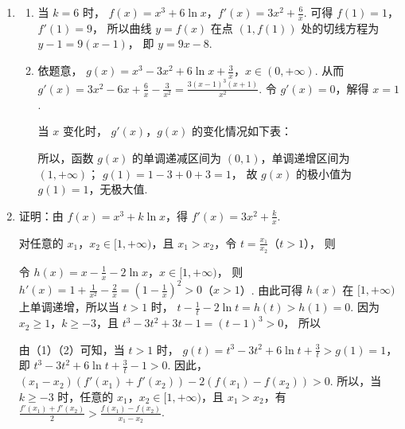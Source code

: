 \begin{solution}
\begin{enumerate}
\item
\begin{enumerate}
\item 当 \( k=6 \) 时，
\(f(x)=x^3+6\ln x\)，\(f'(x)=3x^2+\frac6x\).
可得 \( f(1)=1 \)，\( f'(1)=9 \)，
所以曲线 \( y=f(x) \) 在点 \( (1,f(1)) \) 处的切线方程为
\(y-1=9(x-1)\)，
即
\(y=9x-8\).

\item 依题意，
\(g(x)=x^3-3x^2+6\ln x+\frac3x\)，\(x\in(0,+\infty)\).
从而
\(g'(x)=3x^2-6x+\frac6x-\frac3{x^2} =\frac{3(x-1)^3(x+1)}{x^2}\).
令 \( g'(x)=0 \)，解得 \( x=1 \).

当 \( x \) 变化时， \( g'(x) \)，\( g(x) \) 的变化情况如下表：


所以，函数 \( g(x) \) 的单调递减区间为 \( (0,1) \)，单调递增区间为 \( (1,+\infty) \)；
\(g(1)=1-3+0+3=1\)，
故 \( g(x) \) 的极小值为 \( g(1)=1 \)，无极大值.

\end{enumerate}

\item 证明：由 \( f(x)=x^3+k\ln x \)，得
\(f'(x)=3x^2+\frac{k}{x}\).

对任意的 \(x_1\)，\(x_2\in[1,+\infty)\)，且 \( x_1>x_2 \)，令
\(t=\frac{x_1}{x_2}\)（\(t>1\)），
则

令
\(h(x)=x-\frac1x-2\ln x\)，\(x\in[1,+\infty)\)，
则
\(h'(x)=1+\frac1{x^2}-\frac2x=\left( 1-\frac1x \right)^2>0\)（\(x>1\)）.
由此可得 \( h(x) \) 在 \( [1,+\infty) \) 上单调递增，所以当 \( t>1 \) 时，
\(t-\frac1t-2\ln t=h(t)>h(1)=0\).
因为 \( x_2\ge1 \)，\( k\ge-3 \)，且
\(t^3-3t^2+3t-1=\left( t-1 \right)^3>0\)，
所以

由（1）（2）可知，当 \( t>1 \) 时，
\(g(t)=t^3-3t^2+6\ln t+\frac3t>g(1)=1\)，
即
\(t^3-3t^2+6\ln t+\frac3t-1>0\).
因此，
\(\left( x_1-x_2 \right)\left( f'(x_1)+f'(x_2) \right)-2\left( f(x_1)-f(x_2) \right)>0\).
所以，当 \( k\ge-3 \) 时，任意的 \(x_1\)，\(x_2\in[1,+\infty)\)，且 \( x_1>x_2 \)，有
\(\frac{f'(x_1)+f'(x_2)}{2}>\frac{f(x_1)-f(x_2)}{x_1-x_2}\).
\end{enumerate}
\end{solution}
